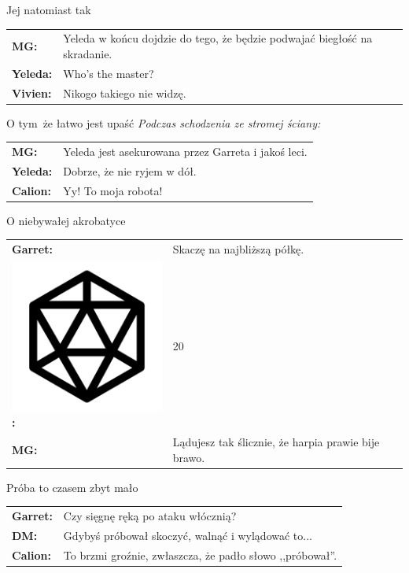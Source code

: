 \documentclass[10pt,twoside,twocolumn]{book}
\begin{document}
\begin{rpg-quotebox}{Jej natomiast tak}
   \begin{tabularx}{\columnwidth}{lX}
      \textbf{MG:} & Yeleda w końcu dojdzie do tego, że będzie podwajać biegłość na skradanie.\\
      \textbf{Yeleda:} & Who's the master?\\
      \textbf{Vivien:} & Nikogo takiego nie widzę.\\
   \end{tabularx}
\end{rpg-quotebox}

\begin{rpg-quotebox}{O tym\, że łatwo jest upaść}
   \textit{Podczas schodzenia ze stromej ściany:}\\

   \begin{tabularx}{\columnwidth}{lX}
      \textbf{MG:} & Yeleda jest asekurowana przez Garreta i jakoś leci.\\
      \textbf{Yeleda:} & Dobrze, że nie ryjem w dół.\\
      \textbf{Calion:} & Yy! To moja robota!\\
   \end{tabularx}
\end{rpg-quotebox}

\begin{rpg-quotebox}{O niebywałej akrobatyce}
   \begin{tabularx}{\columnwidth}{lX}
      \textbf{Garret:} & Skaczę na najbliższą półkę.\\
      \includegraphics[scale=0.06]{img/d20.png}\textbf{:} & 20\\
      \textbf{MG:} & Lądujesz tak ślicznie, że harpia prawie bije brawo.\\
   \end{tabularx}
\end{rpg-quotebox}

\begin{rpg-quotebox}{Próba to czasem zbyt mało}
   \begin{tabularx}{\columnwidth}{lX}
      \textbf{Garret:} & Czy sięgnę ręką po ataku włócznią?\\
      \textbf{DM:} & Gdybyś próbował skoczyć, walnąć i wylądować to...\\
      \textbf{Calion:} & To brzmi groźnie, zwłaszcza, że padło słowo ,,próbował''.\\
   \end{tabularx}
\end{rpg-quotebox}
\end{document}
